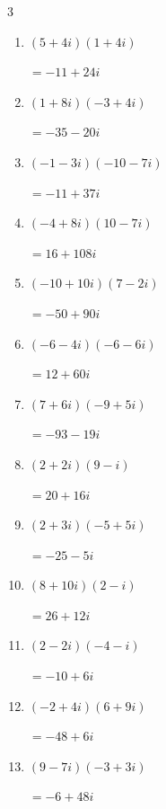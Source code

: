 \begin{multicols}{3}
\begin{enumerate}
        $\displaystyle =44+74i$

  \item $\displaystyle (5+4i)(1+4i)$

        $\displaystyle =-11+24i$

  \item $\displaystyle (1+8i)(-3+4i)$

        $\displaystyle =-35-20i$

  \item $\displaystyle (-1-3i)(-10-7i)$

        $\displaystyle =-11+37i$

  \item $\displaystyle (-4+8i)(10-7i)$

        $\displaystyle =16+108i$

  \item $\displaystyle (-10+10i)(7-2i)$

        $\displaystyle =-50+90i$

  \item $\displaystyle (-6-4i)(-6-6i)$

        $\displaystyle =12+60i$

  \item $\displaystyle (7+6i)(-9+5i)$

        $\displaystyle =-93-19i$

  \item $\displaystyle (2+2i)(9-i)$

        $\displaystyle =20+16i$

\columnbreak %

  \item $\displaystyle (2+3i)(-5+5i)$

        $\displaystyle =-25-5i$

  \item $\displaystyle (8+10i)(2-i)$

        $\displaystyle =26+12i$

  \item $\displaystyle (2-2i)(-4-i)$

        $\displaystyle =-10+6i$

  \item $\displaystyle (-2+4i)(6+9i)$

        $\displaystyle =-48+6i$

  \item $\displaystyle (9-7i)(-3+3i)$

        $\displaystyle =-6+48i$


\end{enumerate}
\end{multicols}
